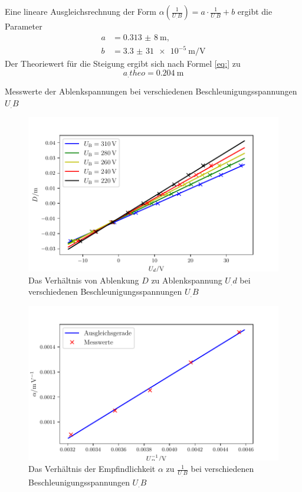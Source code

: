 Eine lineare Ausgleichsrechnung der Form
$\alpha\left(\frac{1}{U_.B}\right)=a\cdot\frac{1}{U_.B}+b$
ergibt die Parameter
\begin{align*}
a&=\SI{0,313(8)}{\metre},\\
b&=\SI{3,3(31)e-5}{\metre\per\volt}
\end{align*}
Der Theoriewert für die Steigung ergibt sich nach Formel \eqref{eq:} zu
\[
a_.{theo}=\SI{0,204}{\metre}
\]
\begin{table}
\centering
\caption{Messwerte der Ablenkspannungen bei verschiedenen Beschleunigungsspannungen $U_.B$}

\label{tab:Elek}
\end{table}
\begin{figure}
\centering
\includegraphics[width=\linewidth-70pt,height=\textheight-70pt,keepaspectratio]{content/images/GraphElek.pdf}
\caption{Das Verhältnis von Ablenkung $D$ zu Ablenkspannung $U_.d$ bei verschiedenen Beschleunigungsspannungen $U_.B$}\label{fig:Elek}
\end{figure}
\begin{figure}
\centering
\includegraphics[width=\linewidth-70pt,height=\textheight-70pt,keepaspectratio]{content/images/GraphElek6.pdf}
\caption{Das Verhältnis der Empfindlichkeit $\alpha$ zu $\frac{1}{U_.B}$ bei verschiedenen Beschleunigungsspannungen $U_.B$}\label{fig:Elek2}
\end{figure}

